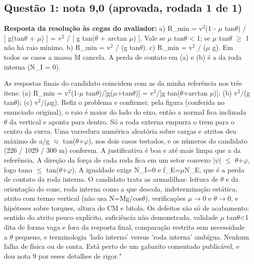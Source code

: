 \documentclass{article}%
\begin{document}
\subsection*{Questão 1: nota 9,0 (aprovada, rodada 1 de 1)}%
\textbf{Resposta da resolução às cegas do avaliador:} a) R\_min = v$^2$(1 - $\mu$ tan$\theta$) / {[} g(tan$\theta$ + $\mu$) {]} = v$^2$ / {[} g tan($\theta$ + arctan $\mu$) {]}. Vale se $\mu$ tan$\theta$ < 1; se $\mu$ tan$\theta$ $\geq$ 1 não há raio mínimo.\newline%
b) R\_min = v$^2$ / (g tan$\theta$).\newline%
c) R\_min = v$^2$ / ($\mu$ g).\newline%
\newline%
Em todos os casos a massa M cancela. A perda de contato em (a) e (b) é a da roda interna (N\_I = 0).\par %
As respostas finais do candidato coincidem com as da minha referência nos três itens: (a) R\_min = v$^2$(1-$\mu$ tan$\theta$)/{[}g($\mu$+tan$\theta$){]} = v$^2$/{[}g tan($\theta$+arctan $\mu$){]}; (b) v$^2$/(g tan$\theta$); (c) v$^2$/($\mu$g). Refiz o problema e confirmei: pela figura (conferida no enunciado original), o raio é maior do lado do eixo, então a normal fica inclinada $\theta$ da vertical e aponta para dentro. Só a roda externa empurra o trem para o centro da curva. Uma varredura numérica aleatória sobre cargas e atritos deu máximo de a/g $\approx$ tan($\theta$+$\varphi$), nos dois casos testados, e os números do candidato (226 / 1029 / 300 m) conferem. A justificativa é boa e até mais limpa que a da referência. A direção da força de cada roda fica em um setor convexo |$\psi$| $\leq$ $\theta$+$\varphi$, logo tan$\alpha$ $\leq$ tan($\theta$+$\varphi$). A igualdade exige N\_I=0 e f\_E=$\mu$N\_E, que é a perda de contato da roda interna. O candidato trata as armadilhas: leitura de $\theta$ e da orientação do cone, roda interna como a que descola, indeterminação estática, atrito com termo vertical (não usa N=Mg/cos$\theta$), verificações $\mu$$\to$0 e $\theta$$\to$0, e hipóteses sobre torques, altura do CM e bitola. Os defeitos são só de acabamento: sentido do atrito pouco explícito, suficiência não demonstrada, validade $\mu$ tan$\theta$<1 dita de forma vaga e fora da resposta final, comparação restrita sem necessidade a $\theta$ pequeno, e terminologia 'lado interno' versus 'roda interna' ambígua. Nenhum falha de física ou de conta. Está perto de um gabarito comentado publicável, e dou nota 9 por esses detalhes de rigor."%
\end{document}
